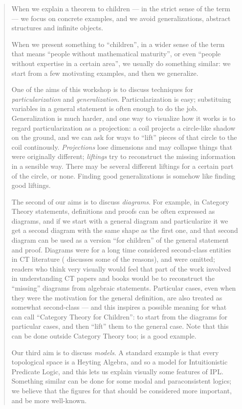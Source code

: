 \documentclass[oneside,12pt]{article}
\begin{document}
\begin{quotation}

  When we explain a theorem to children --- in the strict sense of the
  term --- we focus on concrete examples, and we avoid
  generalizations, abstract structures and infinite objects.

  When we present something to ``children'', in a wider sense of the
  term that means ``people without mathematical maturity'', or even
  ``people without expertise in a certain area'', we usually do
  something similar: we start from a few motivating examples, and then
  we generalize.

  One of the aims of this workshop is to discuss techniques for {\sl
    particularization} and {\sl generalization}. Particularization is
  easy; substituing variables in a general statement is often enough
  to do the job. Generalization is much harder, and one way to
  visualize how it works is to regard particularization as a
  projection: a coil projects a circle-like shadow on the ground, and
  we can ask for ways to ``lift'' pieces of that circle to the coil
  continously. {\sl Projections} lose dimensions and may collapse
  things that were originally different; {\sl liftings} try to
  reconstruct the missing information in a sensible way. There may be
  several different liftings for a certain part of the circle, or
  none. Finding good generalizations is somehow like finding good
  liftings.

  The second of our aims is to discuss {\sl diagrams}. For example, in
  Category Theory statements, definitions and proofs can be often
  expressed as diagrams, and if we start with a general diagram and
  particularize it we get a second diagram with the same shape as the
  first one, and that second diagram can be used as a version ``for
  children'' of the general statement and proof. Diagrams were for a
  long time considered second-class entities in CT literature
  (\cite{Kromer} discusses some of the reasons), and were omitted;
  readers who think very visually would feel that part of the work
  involved in understanding CT papers and books would be to
  reconstruct the ``missing'' diagrams from algebraic statements.
  Particular cases, even when they were the motivation for the general
  definition, are also treated as somewhat second-class --- and this
  inspires a possible meaning for what can call ``Category Theory for
  Children'': to start from the diagrams for particular cases, and
  then ``lift'' them to the general case. Note that this can be done
  outside Category Theory too; \cite{Jamnik} is a good example.

  Our third aim is to discuss {\sl models}. A standard example is that
  every topological space is a Heyting Algebra, and so a model for
  Intuitionistic Predicate Logic, and this lets us explain visually
  some features of IPL. Something similar can be done for some modal
  and paraconsistent logics; we believe that the figures for that
  should be considered more important, and be more well-known.

\end{quotation}
\end{document}
